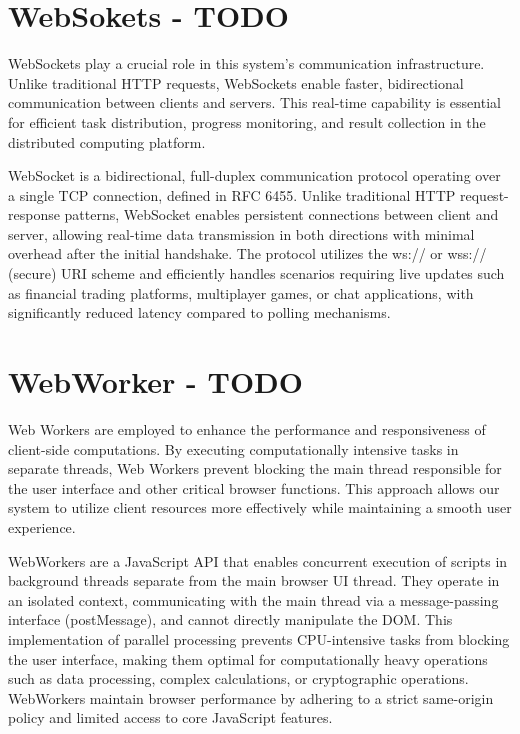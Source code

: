 \section{WebSokets - TODO}
\label{sec:methodology:websokets}
WebSockets play a crucial role in this system's communication infrastructure. Unlike traditional HTTP requests, WebSockets enable faster, bidirectional communication between clients and servers. This real-time capability is essential for efficient task distribution, progress monitoring, and result collection in the distributed computing platform.

WebSocket is a bidirectional, full-duplex communication protocol operating over a single TCP connection, defined in RFC 6455. Unlike traditional HTTP request-response patterns, WebSocket enables persistent connections between client and server, allowing real-time data transmission in both directions with minimal overhead after the initial handshake. The protocol utilizes the ws:// or wss:// (secure) URI scheme and efficiently handles scenarios requiring live updates such as financial trading platforms, multiplayer games, or chat applications, with significantly reduced latency compared to polling mechanisms.

\cite{methodology:websockets1, methodology:websockets2, methodology:websockets3}

\section{WebWorker - TODO}
\label{sec:methodology:webworker}
Web Workers are employed to enhance the performance and responsiveness of client-side computations. By executing computationally intensive tasks in separate threads, Web Workers prevent blocking the main thread responsible for the user interface and other critical browser functions. This approach allows our system to utilize client resources more effectively while maintaining a smooth user experience.

WebWorkers are a JavaScript API that enables concurrent execution of scripts in background threads separate from the main browser UI thread. They operate in an isolated context, communicating with the main thread via a message-passing interface (postMessage), and cannot directly manipulate the DOM. This implementation of parallel processing prevents CPU-intensive tasks from blocking the user interface, making them optimal for computationally heavy operations such as data processing, complex calculations, or cryptographic operations. WebWorkers maintain browser performance by adhering to a strict same-origin policy and limited access to core JavaScript features.

